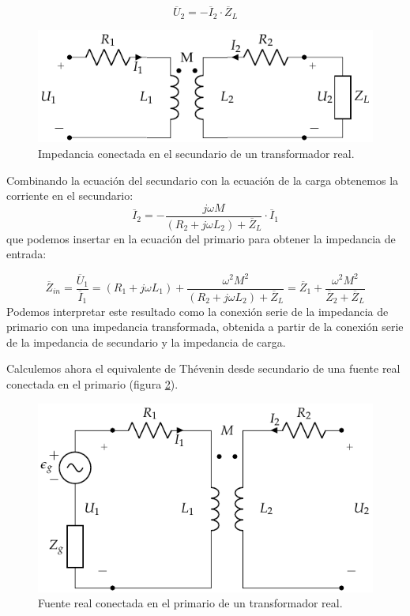 \begin{equation*}
  \overline{U}_2 = - \overline{I}_2 \cdot \overline{Z}_L
\end{equation*}

\begin{figure}
  \centering
  \includegraphics[height=0.2\textheight]{../figs/Trafo_Real_ImpSec.pdf}
  \caption{Impedancia conectada en el secundario de un transformador
    real.}
  \label{fig:trafo-real-impedancia-secundario}
\end{figure}


Combinando la ecuación del secundario con la ecuación de la carga
obtenemos la corriente en el secundario:
\[
  \overline{I}_2 = - \frac{j \omega M}{(R_2 + j \omega L_2) +
    \overline{Z}_L} \cdot \overline{I}_1
\]
que podemos insertar en la ecuación del primario para obtener la
impedancia de entrada:

\begin{equation}
  \label{eq:trafo-real-impedancia-entrada}
  \overline{Z}_{in}  = \frac{\overline{U}_1}{\overline{I}_1} =  (R_1 + j \omega L_1) + \frac{\omega^2 M^2}{(R_2 + j \omega L_2) + \overline{Z}_L} = \boxed{\overline{Z}_1 + \frac{\omega^2 M^2}{\overline{Z}_2 + \overline{Z}_L}}
\end{equation}
Podemos interpretar este resultado como la conexión serie de la
impedancia de primario con una impedancia transformada, obtenida a
partir de la conexión serie de la impedancia de secundario y la
impedancia de carga.

Calculemos ahora el equivalente de Thévenin desde secundario de una
fuente real conectada en el primario (figura
\ref{fig:trafo-real-fuente-primario}).

\begin{figure}
  \centering
  \includegraphics[height=0.2\textheight]{../figs/Trafo_Real_FuentePrimario.pdf}
  \caption{Fuente real conectada en el primario de un transformador
    real.}
  \label{fig:trafo-real-fuente-primario}
\end{figure}


